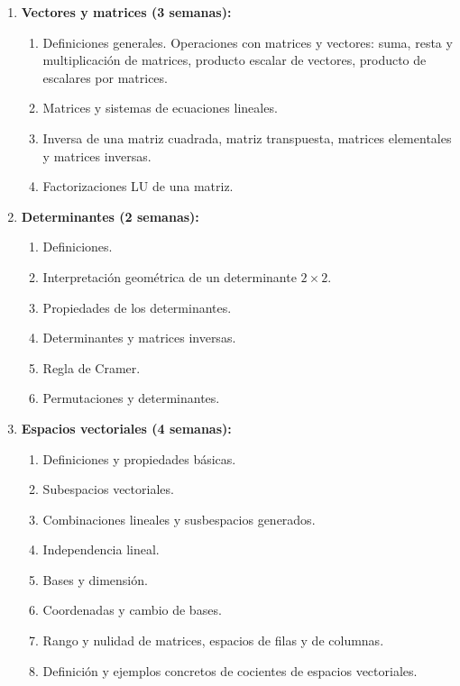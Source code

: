 \begin{refsection}
\begin{enumerate}
\item \textbf{Vectores y matrices (3 semanas):} 
\begin{enumerate}
    \item Definiciones generales. Operaciones con matrices y vectores: suma, resta y multiplicación de matrices, producto escalar de vectores, producto de escalares por matrices.
    \item Matrices y sistemas de ecuaciones lineales.
    \item Inversa de una matriz cuadrada, matriz transpuesta, matrices elementales y matrices inversas.
    \item Factorizaciones LU de una matriz.
\end{enumerate}

\item \textbf{Determinantes (2 semanas):} 
\begin{enumerate}
    \item Definiciones.
    \item Interpretación geométrica de un determinante $2 \times 2$.
    \item Propiedades de los determinantes.
    \item Determinantes y matrices inversas.
    \item Regla de Cramer.
    \item Permutaciones y determinantes.
\end{enumerate}

\item \textbf{Espacios vectoriales (4 semanas):} 
\begin{enumerate}
    \item Definiciones y propiedades básicas.
    \item Subespacios vectoriales.
    \item Combinaciones lineales y susbespacios generados.
    \item Independencia lineal.
    \item Bases y dimensión.
    \item Coordenadas y cambio de bases.
    \item Rango y nulidad de matrices, espacios de filas y de columnas.
    \item Definición y ejemplos concretos de cocientes de espacios vectoriales.
\end{enumerate}


\end{enumerate}
\end{refsection}
